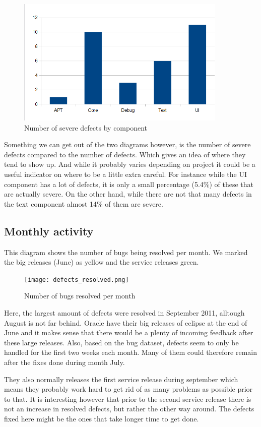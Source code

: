 \documentclass{article}
\begin{document}
\begin{figure}[H]
\center
\includegraphics[width=100mm]{severe_defects_per_component.png}
\caption{Number of severe defects by component}
\end{figure}

Something we can get out of the two diagrams however, is the number of severe defects compared to the number of defects.
Which gives an idea of where they tend to show up.
And while it probably varies depending on project it could be a useful indicator on where to be a little extra careful.
For instance while the UI component has a lot of defects, it is only a small percentage (5.4\%) of these that are actually severe.
On the other hand, while there are not that many defects in the text component almost 14\% of them are severe.

\subsection{Monthly activity}

This diagram shows the number of bugs being resolved per month.
We marked the big releases (June) as yellow and the service releases green.
\begin{figure}[H]
\center
\texttt{[image: defects\_resolved.png]}
\caption{Number of bugs resolved per month}
\end{figure}

Here, the largest amount of defects were resolved in September 2011, alltough August is not far behind. 
Oracle have their big releases of eclipse at the end of June and it makes sense that there would be a plenty of incoming feedback after these large releases.
Also, based on the bug dataset, defects seem to only be handled for the first two weeks each month.
Many of them could therefore remain after the fixes done during month July.

They also normally releases the first service release during september which means they probably work hard to get rid of as many problems as possible prior to that.
It is interesting however that prior to the second service release there is not an increase in resolved defects, but rather the other way around. The defects fixed here might be the ones that take longer time to get done.

\end{document}
